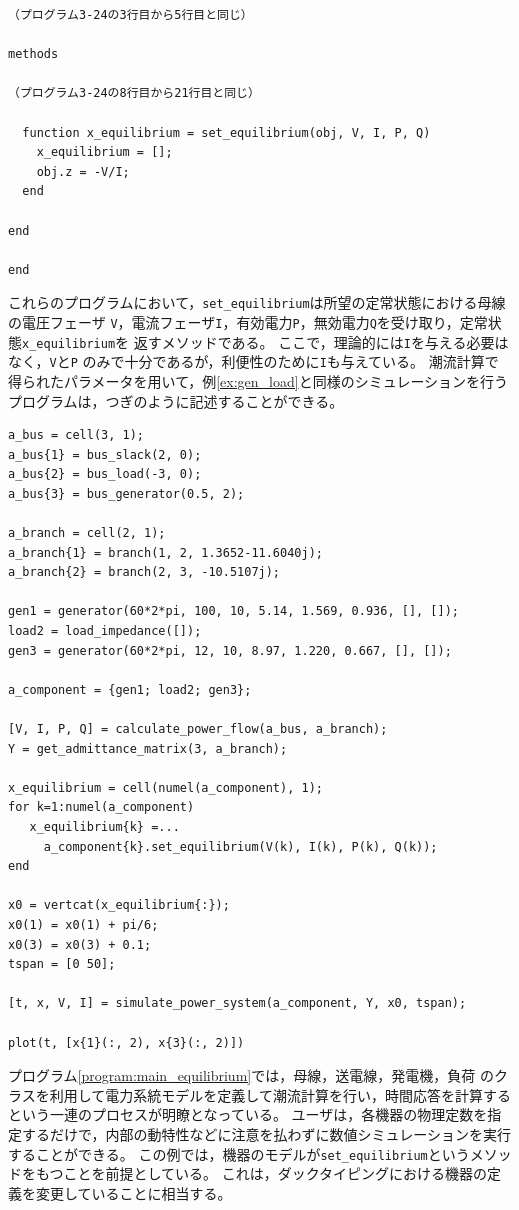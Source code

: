 \documentclass[tombow,dvipdfmx]{corona-a5-1.1}
\begin{document}
\begin{例}[発電機や負荷の定常状態を計算するメソッドの追加]
\begin{PROGRAMA}[count,title={load\_impedance.m}]
\begin{verbatim}
（プログラム3-24の3行目から5行目と同じ）

methods
  
（プログラム3-24の8行目から21行目と同じ）

  function x_equilibrium = set_equilibrium(obj, V, I, P, Q)
    x_equilibrium = [];
    obj.z = -V/I;
  end

end

end
\end{verbatim}
\end{PROGRAMA}
これらのプログラムにおいて，\verb|set_equilibrium|は所望の定常状態における母線の電圧フェーザ
\verb|V|，電流フェーザ\verb|I|，有効電力\verb|P|，無効電力\verb|Q|を受け取り，定常状態\verb|x_equilibrium|を
返すメソッドである。
ここで，理論的には\verb|I|を与える必要はなく，\verb|V|と\verb|P|
のみで十分であるが，利便性のために\verb|I|も与えている。
潮流計算で得られたパラメータを用いて，例\ref{ex:gen_load}と同様のシミュレーションを行うプログラムは，つぎのように記述することができる。

\smallskip
\begin{PROGRAMA}[count,title={main\_simulation\_3bus\_equilibrium.m}]\label{program:main_equilibrium}
\begin{verbatim}
a_bus = cell(3, 1);
a_bus{1} = bus_slack(2, 0);
a_bus{2} = bus_load(-3, 0);
a_bus{3} = bus_generator(0.5, 2);

a_branch = cell(2, 1);
a_branch{1} = branch(1, 2, 1.3652-11.6040j);
a_branch{2} = branch(2, 3, -10.5107j);

gen1 = generator(60*2*pi, 100, 10, 5.14, 1.569, 0.936, [], []);
load2 = load_impedance([]);
gen3 = generator(60*2*pi, 12, 10, 8.97, 1.220, 0.667, [], []);

a_component = {gen1; load2; gen3};

[V, I, P, Q] = calculate_power_flow(a_bus, a_branch);
Y = get_admittance_matrix(3, a_branch);

x_equilibrium = cell(numel(a_component), 1);
for k=1:numel(a_component)
   x_equilibrium{k} =...
     a_component{k}.set_equilibrium(V(k), I(k), P(k), Q(k)); 
end

x0 = vertcat(x_equilibrium{:});
x0(1) = x0(1) + pi/6;
x0(3) = x0(3) + 0.1;
tspan = [0 50];

[t, x, V, I] = simulate_power_system(a_component, Y, x0, tspan);

plot(t, [x{1}(:, 2), x{3}(:, 2)])
\end{verbatim}
\end{PROGRAMA}

プログラム\ref{program:main_equilibrium}では，母線，送電線，発電機，負荷
のクラスを利用して電力系統モデルを定義して潮流計算を行い，時間応答を計算するという一連のプロセスが明瞭となっている。
ユーザは，各機器の物理定数を指定するだけで，内部の動特性などに注意を払わずに数値シミュレーションを実行することができる。
この例では，機器のモデルが\verb|set_equilibrium|というメソッドをもつことを前提としている。
これは，ダックタイピングにおける機器の定義を変更していることに相当する。
\end{例}
\end{document}
